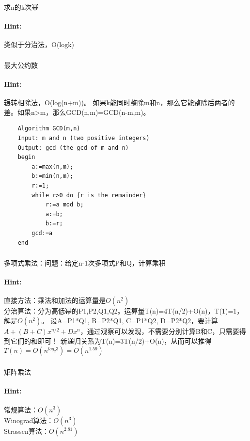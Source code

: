 \documentclass{article}
\begin{document}
     \subsubsection{}求n的k次幂
     \paragraph{Hint:}类似于分治法，O(logk)
     
     \subsubsection{}最大公约数
     \paragraph{Hint:}辗转相除法，O(log(n+m))。
     如果k能同时整除m和n，那么它能整除后两者的差。如果n>m，那么GCD(n,m)=GCD(n-m,m)。
     
     \lstset{language=C}
    \begin{lstlisting} 
    Algorithm GCD(m,n)
    Input: m and n (two positive integers)
    Output: gcd (the gcd of m and n)
    begin
        a:=max(n,m);
        b:=min(n,m);
        r:=1;
        while r>0 do {r is the remainder}
            r:=a mod b;
            a:=b;
            b:=r;
        gcd:=a
    end

     \end{lstlisting} 
     
    \subsubsection{}多项式乘法：问题：给定n-1次多项式P和Q，计算乘积
     \paragraph{Hint:}直接方法：乘法和加法的运算量是$O(n^2)$\\
     分治算法：分为高低幂的P1,P2,Q1,Q2。运算量T(n)=4T(n/2)+O(n)，T(1)=1，解是$O(n^2)$。
     设A=P1*Q1, B=P2*Q1, C=P1*Q2, D=P2*Q2，要计算$A+(B+C)x^{n/2}+Dx^{n}$，通过观察可以发现，不需要分别计算B和C，只需要得到它们的和即可！
     新递归关系为T(n)=3T(n/2)+O(n)，从而可以推得$T(n)=O(n^{log_{2}3})=O(n^{1.59})$

     \subsubsection{}矩阵乘法
     \paragraph{Hint:}
     常规算法：$O(n^3)$\\
     Winograd算法：$O(n^3)$\\
     Strassen算法：$O(n^{2.81})$\\
     
\end{document}
